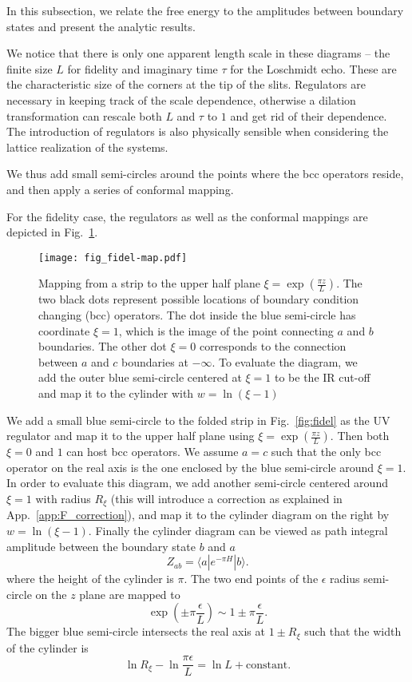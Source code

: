 
In this subsection, we relate the free energy to the amplitudes between boundary states and present the analytic results. 

We notice that there is only one apparent length scale in these diagrams -- the finite size $L$ for fidelity and imaginary time $\tau$ for the Loschmidt echo. These are the characteristic size of the corners at the tip of the slits. Regulators are necessary in keeping track of the scale dependence, otherwise a dilation transformation can rescale both $L$ and $\tau$ to $1$ and get rid of their dependence. The introduction of regulators is also physically sensible when considering the lattice realization of the systems. 

We thus add small semi-circles around the points where the bcc operators reside, and then apply a series of conformal mapping. 

For the fidelity case, the regulators as well as the conformal mappings are depicted in Fig.~\ref{fig:fidel-map}. 
\begin{figure}[h]
\centering
\texttt{[image: fig\_fidel-map.pdf]}
\caption{Mapping from a strip to the upper half plane $\xi  = \exp( \frac{\pi z}{L} ) $. The two black dots represent possible locations of boundary condition changing (bcc) operators. The dot inside the blue semi-circle has coordinate $\xi = 1$, which is the image of the point connecting $a$ and $b$ boundaries. The other dot $\xi = 0$ corresponds to the connection between $a$ and $c$ boundaries at $- \infty$. To evaluate the diagram, we add the outer blue semi-circle centered at $\xi = 1$ to be the IR cut-off and map it to the cylinder with $w = \ln(\xi - 1)$}
\label{fig:fidel-map}
\end{figure}
We add a small blue semi-circle to the folded strip in Fig.~\ref{fig:fidel} as the UV regulator and map it to the upper half plane using $\xi  = \exp( \frac{\pi z}{L} )$. Then both $\xi = 0$ and $1$ can host bcc operators. We assume $a = c$ such that the only bcc operator on the real axis is the one enclosed by the blue semi-circle around $\xi = 1$. In order to evaluate this diagram, we add another semi-circle centered around $\xi = 1$ with radius $R_{\xi}$ (this will introduce a correction as explained in App.~\ref{app:F_correction}), and map it to the cylinder diagram on the right by $w = \ln ( \xi- 1)$. Finally the cylinder diagram can be viewed as path integral amplitude between the boundary state $b$ and $a$
\begin{equation}
\label{eq:partition_fun}
Z_{ab} = \langle a | e^{-\pi H } |b \rangle.
\end{equation}
where the height of the cylinder is $\pi$. The two end points of the $\epsilon$ radius semi-circle on the $z$ plane are mapped to
\begin{equation}
\exp( \pm \pi \frac{\epsilon}{ L}  ) \sim 1 \pm \pi \frac{\epsilon}{L} .
\end{equation}
The bigger blue semi-circle intersects the real axis at $1 \pm R_{\xi}$ such that the width of the cylinder is 
\begin{equation}
\label{eq:fidel_cyd_width}
\ln R_{\xi} - \ln \frac{\pi \epsilon}{L} = \ln L + \text{constant}.
\end{equation}

